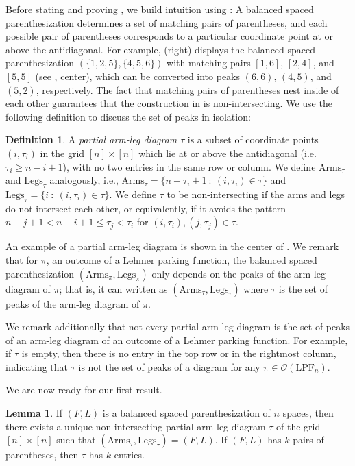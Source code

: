 \documentclass{amsart}
\newcommand{\IT}{\mathrm{LPF}}
\newcommand{\arms}{\mathrm{Arms}}
\newcommand{\legs}{\mathrm{Legs}}
\newcommand{\Out}{\mathcal{O}}
\theoremstyle{definition}
\newtheorem{lemma}[theorem]{Lemma}
\theoremstyle{definition}
\newtheorem{definition}{Definition}[section]
\theoremstyle{remark}
\begin{document}
Before stating and proving , we build intuition using : A balanced spaced parenthesization  determines a set of matching pairs of parentheses, and each possible pair of parentheses corresponds to a particular coordinate point at or above the antidiagonal. 
For example,  (right) displays the balanced spaced parenthesization $(\{1,2,5\},\{4,5,6\})$ with matching pairs $[1,6]$, $[2,4]$, and $[5,5]$ (see , center), which can be converted into peaks $(6,6)$, $(4,5)$, and $(5,2)$, respectively. 
The fact that matching pairs of parentheses nest inside of each other guarantees that the construction in  is non-intersecting. 
We use the following definition to discuss the set of peaks in isolation:


\begin{definition}\label{def:partial}
    A \textit{partial arm-leg diagram} $\tau$ is a subset of coordinate points $(i,\tau_i)$ in the grid $[n]\times[n]$ which lie at or above the antidiagonal (i.e. $\tau_i\geq n-i+1$), with no two entries in the same row or column. We define $\arms_\tau$ and $\legs_\tau$ analogously, i.e., $\arms_\tau=\{n-\tau_i+1~:~(i,\tau_i)\in\tau\}$ and $\legs_\tau=\{i~:~(i,\tau_i)\in\tau\}$. We define $\tau$ to be non-intersecting if the arms and legs do not intersect each other, or equivalently, if it avoids the pattern $n-j+1<n-i+1\le\tau_j<\tau_i$ for $(i,\tau_i),(j,\tau_j)\in\tau$.
\end{definition}

An example of a partial arm-leg diagram is shown in the center of . We remark that for $\pi$, an outcome of a Lehmer parking function, the balanced spaced parenthesization $(\arms_\pi,\legs_\pi)$ only depends on the peaks of the arm-leg diagram of $\pi$; that is, it can written as $(\arms_\tau,\legs_\tau)$ where $\tau$ is the set of peaks of the arm-leg diagram of $\pi$.

We remark additionally that not every partial arm-leg diagram is the set of peaks of an arm-leg diagram of an outcome of a Lehmer parking function. For example, if $\tau$ is empty, then there is no entry in the top row or in the rightmost column, indicating that $\tau$ is not the set of peaks of a diagram for any $\pi\in \Out(\IT_n)$.

We are now ready for our first result.

\begin{lemma}\label{lem:balanced -> non-intersecting partial}
    If $(F,L)$ is a balanced spaced parenthesization of $n$ spaces, then there exists a unique non-intersecting partial arm-leg diagram $\tau$ of the grid $[n]\times[n]$ such that $(\arms_\tau,\legs_\tau)=(F,L)$. If $(F,L)$ has $k$ pairs of parentheses, then $\tau$ has $k$ entries. 
\end{lemma}
\end{document}
